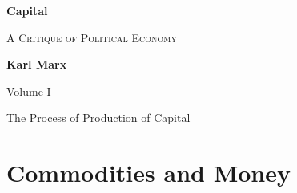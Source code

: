 \documentclass[a4paper,11pt]{report}
\begin{document}
\begin{titlepage}
    \begin{center}
        \vspace*{1cm}
 
        {\Huge  \textbf{Capital}}
 
        \vspace{0.5cm}
        {\textsc{A Critique of Political Economy}}
                   
        \vspace{1.5cm}
        
        {\textbf{Karl Marx}}

        \vspace{1.5cm}

        \vspace{0.5cm}
         Volume I

        \vspace{0.5cm}
         The Process of Production of Capital

        \vfill
    \end{center}
 \end{titlepage}

\tableofcontents

\part{Commodities and Money}

% 
% 
% 


\printbibliography
\end{document}
